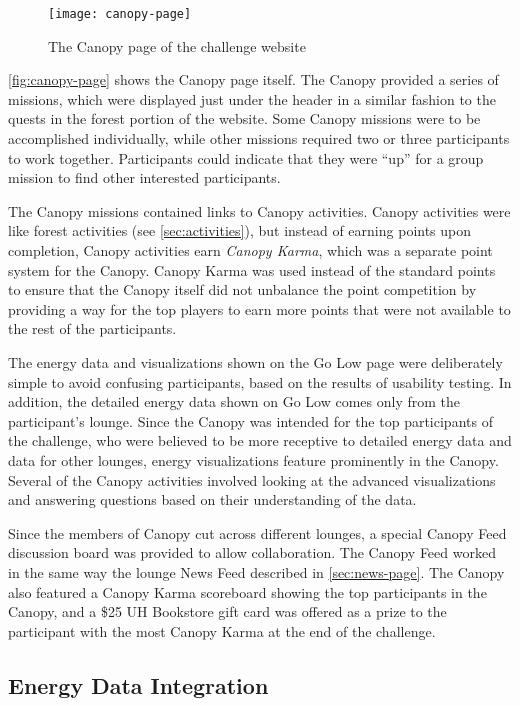 \begin{figure}[htbp]
	\centering
		\texttt{[image: canopy-page]}
		\caption{The Canopy page of the challenge website}
\label{fig:canopy-page}
\end{figure}

\autoref{fig:canopy-page} shows the Canopy page itself. The Canopy provided a series of missions, which were displayed just under the header in a similar fashion to the quests in the forest portion of the website. Some Canopy missions were to be accomplished individually, while other missions required two or three participants to work together. Participants could indicate that they were ``up'' for a group mission to find other interested participants.

The Canopy missions contained links to Canopy activities. Canopy activities were like forest activities (see \autoref{sec:activities}), but instead of earning points upon completion, Canopy activities earn \emph{Canopy Karma}, which was a separate point system for the Canopy. Canopy Karma was used instead of the standard points to ensure that the Canopy itself did not unbalance the point competition by providing a way for the top players to earn more points that were not available to the rest of the participants.

The energy data and visualizations shown on the Go Low page were deliberately simple to avoid confusing participants, based on the results of usability testing. In addition, the detailed energy data shown on Go Low comes only from the participant's lounge. Since the Canopy was intended for the top participants of the challenge, who were believed to be more receptive to detailed energy data and data for other lounges, energy visualizations feature prominently in the Canopy. Several of the Canopy activities involved looking at the advanced visualizations and answering questions based on their understanding of the data.

Since the members of Canopy cut across different lounges, a special Canopy Feed discussion board was provided to allow collaboration. The Canopy Feed worked in the same way the lounge News Feed described in \autoref{sec:news-page}. The Canopy also featured a Canopy Karma scoreboard showing the top participants in the Canopy, and a \$25 UH Bookstore gift card was offered as a prize to the participant with the most Canopy Karma at the end of the challenge.


\subsection{Energy Data Integration}
\label{sec:energy-data-integration}

